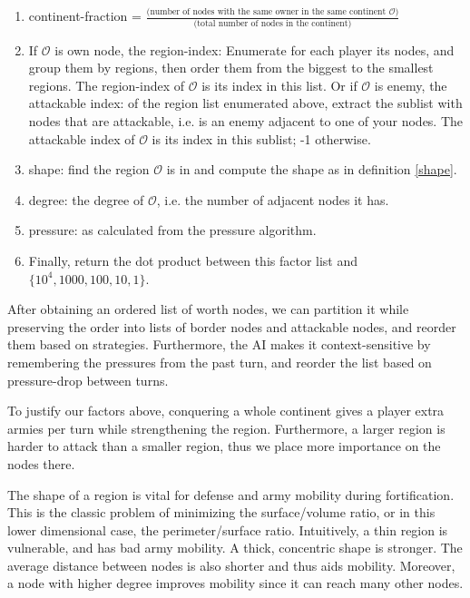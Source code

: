 \documentclass[12pt]{article}  %
\begin{document}
\begin{enumerate}
	\item continent-fraction = $\frac{\text{(number of nodes with the same owner in the same continent $\mathcal{O}$)}}{\text{(total number of nodes in the continent)}}$
	\item If $\mathcal{O}$ is own node, the region-index: Enumerate for each player its nodes, and group them by regions, then order them from the biggest to the smallest regions. The region-index of $\mathcal{O}$ is its index in this list. Or if $\mathcal{O}$ is enemy, the attackable index: of the region list enumerated above, extract the sublist with nodes that are attackable, i.e. is an enemy adjacent to one of your nodes. The attackable index of $\mathcal{O}$ is its index in this sublist; -1 otherwise.
	\item shape: find the region $\mathcal{O}$ is in and compute the shape as in definition \ref{shape}.
	\item degree: the degree of $\mathcal{O}$, i.e. the number of adjacent nodes it has.
	\item pressure: as calculated from the pressure algorithm.
	\item Finally, return the dot product between this factor list and $\{10^{4}, 1000, 100, 10, 1\}$.
\end{enumerate}


After obtaining an ordered list of worth nodes, we can partition it while preserving the order into lists of border nodes and attackable nodes, and reorder them based on strategies. Furthermore, the AI makes it context-sensitive by remembering the pressures from the past turn, and reorder the list based on pressure-drop between turns.



To justify our factors above, conquering a whole continent gives a player extra armies per turn while strengthening the region. Furthermore, a larger region is harder to attack than a smaller region, thus we place more importance on the nodes there. 

The shape of a region is vital for defense and army mobility during fortification. This is the classic problem of minimizing the surface/volume ratio, or in this lower dimensional case, the perimeter/surface ratio. Intuitively, a thin region is vulnerable, and has bad army mobility. A thick, concentric shape is stronger. The average distance between nodes is also shorter and thus aids mobility. Moreover, a node with higher degree improves mobility since it can reach many other nodes.
\end{document}

